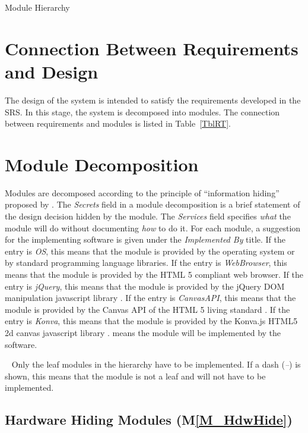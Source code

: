 \documentclass[12pt, titlepage]{article}
\newcommand{\mref}[1]{M\ref{#1}}
\begin{document}
\begin{table}[h!]
\centering

\caption{Module Hierarchy}
\label{TblMH}
\end{table}

\section{Connection Between Requirements and Design} \label{SecConnection}

The design of the system is intended to satisfy the requirements developed in
the SRS. In this stage, the system is decomposed into modules. The connection
between requirements and modules is listed in Table~\ref{TblRT}.

\section{Module Decomposition} \label{SecMD}

Modules are decomposed according to the principle of ``information hiding''
proposed by \citet{ParnasEtAl1984}. The \emph{Secrets} field in a module
decomposition is a brief statement of the design decision hidden by the
module. The \emph{Services} field specifies \emph{what} the module will do
without documenting \emph{how} to do it. For each module, a suggestion for the
implementing software is given under the \emph{Implemented By} title. If the
entry is \emph{OS}, this means that the module is provided by the operating
system or by standard programming language libraries.
If the entry is \emph{WebBrowser}, this means that the module is provided by the 
HTML 5 \cite{html5} compliant web browser.
If the entry is \emph{jQuery}, this means that the module is provided by the 
jQuery DOM \cite{html_DOM} manipulation javascript library \cite{jquery}.
If the entry is \emph{CanvasAPI}, this means that the module is provided by the 
Canvas API of the HTML 5 living standard \cite{html_std_canvas}.
If the entry is \emph{Konva}, this means that the module is provided by the 
Konva.js HTML5 2d canvas javascript library \cite{konva_2021}.
\emph{\progname{}} means the module will be implemented by the \progname{} software.

~\newline
Only the leaf modules in the hierarchy have to be implemented. If a dash
(\emph{--}) is shown, this means that the module is not a leaf and will not have
to be implemented.

\subsection{Hardware Hiding Modules (\mref{M_HdwHide})}
\end{document}
